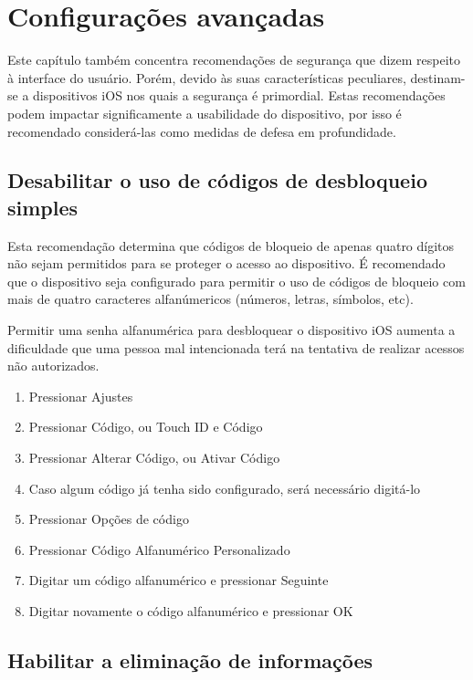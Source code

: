 \chapter{Configura\c c\~oes avan\c cadas}

Este cap\'itulo tamb\'em concentra recomenda\c c\~oes de seguran\c ca que dizem respeito \`a interface do usu\'ario. Por\'em, devido \`as suas caracter\'isticas peculiares, destinam-se a dispositivos iOS nos quais a seguran\c ca \'e primordial. Estas recomenda\c c\~oes podem impactar significamente a usabilidade do dispositivo, por isso \'e recomendado consider\'a-las como medidas de defesa em profundidade.

\section{Desabilitar o uso de c\'odigos de desbloqueio simples}

Esta recomenda\c c\~ao determina que c\'odigos de bloqueio de apenas quatro d\'igitos n\~ao sejam permitidos para se proteger o acesso ao dispositivo. \'E recomendado que o dispositivo seja configurado para permitir o uso de c\'odigos de bloqueio com mais de quatro caracteres alfan\'umericos (n\'umeros, letras, s\'imbolos, etc).

Permitir uma senha alfanum\'erica para desbloquear o dispositivo iOS aumenta a dificuldade que uma pessoa mal intencionada ter\'a na tentativa de realizar acessos n\~ao autorizados.

\begin{enumerate}
\item Pressionar Ajustes
\item Pressionar C\'odigo, ou Touch ID e C\'odigo
\item Pressionar Alterar C\'odigo, ou Ativar C\'odigo
\item Caso algum c\'odigo j\'a tenha sido configurado, ser\'a necess\'ario digit\'a-lo
\item Pressionar Op\c c\~oes de c\'odigo
\item Pressionar C\'odigo Alfanum\'erico Personalizado
\item Digitar um c\'odigo alfanum\'erico e pressionar Seguinte
\item Digitar novamente o c\'odigo alfanum\'erico e pressionar OK
\end{enumerate}

\section{Habilitar a elimina\c c\~ao de informa\c c\~oes}

